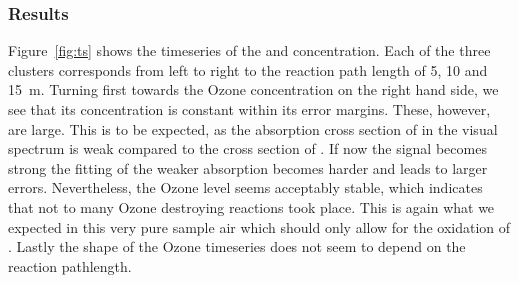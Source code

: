\subsubsection{Results}
\label{sec:no-results}

Figure~\ref{fig:ts} shows the timeseries of the  and 
concentration. Each of the three clusters corresponds from left to
right to the reaction path length of \num{5}, \num{10} and
\SI{15}{\meter}. Turning first towards the Ozone concentration on the
right hand side, we see that its concentration is constant within its
error margins. These, however, are large. This is to be expected, as
the absorption cross section of  in the visual spectrum is weak
compared to the cross section of . If now the  signal
becomes strong the fitting of the weaker  absorption becomes
harder and leads to larger errors. Nevertheless, the Ozone level seems
acceptably stable, which indicates that not to many Ozone destroying
reactions took place. This is again what we expected in this very pure
sample air which should only allow for the oxidation of
. Lastly the shape of the Ozone timeseries does not seem to
depend on the reaction pathlength.


